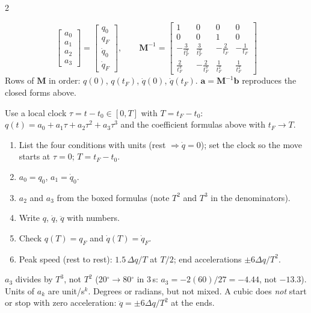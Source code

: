 \begin{multicols}{2}
\begin{fbx}[Matrix form (the 4 conditions written as $\mathbf M\mathbf a=\mathbf b$) \pg{16}, notebook]
\[\begin{bmatrix}a_0\\a_1\\a_2\\a_3\end{bmatrix}=\begin{bmatrix}q_0\\q_F\\\dot q_0\\\dot q_F\end{bmatrix},\qquad
\mathbf M^{-1}=\begin{bmatrix}1&0&0&0\\0&0&1&0\\-\frac3{t_F^2}&\frac3{t_F^2}&-\frac2{t_F}&-\frac1{t_F}\\[1mm]\frac2{t_F^3}&-\frac2{t_F^3}&\frac1{t_F^2}&\frac1{t_F^2}\end{bmatrix}\]
Rows of $\mathbf M$ in order: $q(0)$, $q(t_F)$, $\dot q(0)$, $\dot q(t_F)$. $\mathbf a=\mathbf M^{-1}\mathbf b$ reproduces the closed forms above. \chk
{}
\end{fbx}
\begin{fbx}
Use a local clock $\tau=t-t_0\in[0,T]$ with $T=t_F-t_0$: $q(t)=a_0+a_1\tau+a_2\tau^2+a_3\tau^3$ and the coefficient formulas above with $t_F\to T$.
\end{fbx}
\begin{recipe}
\begin{enumerate}
\item List the four conditions with units (rest $\Rightarrow\dot q=0$); set the clock so the move starts at $\tau=0$; $T=t_F-t_0$.
\item $a_0=q_0$, $a_1=\dot q_0$.
\item $a_2$ and $a_3$ from the boxed formulas (note $T^2$ and $T^3$ in the denominators).
\item Write $q$, $\dot q$, $\ddot q$ with numbers.
\item Check $q(T)=q_F$ and $\dot q(T)=\dot q_F$.
\item Peak speed (rest to rest): $1.5\,\Delta q/T$ at $T/2$; end accelerations $\pm6\Delta q/T^2$.
\end{enumerate}
\end{recipe}
\begin{trap}
$a_3$ divides by $T^3$, not $T^2$ (20$^\circ\to$80$^\circ$ in 3\,s: $a_3=-2(60)/27=-4.44$, not $-13.3$). Units of $a_k$ are unit/s$^k$. Degrees or radians, but not mixed. A cubic does \emph{not} start or stop with zero acceleration: $\ddot q=\pm6\Delta q/T^2$ at the ends.
\end{trap}


\end{multicols}
